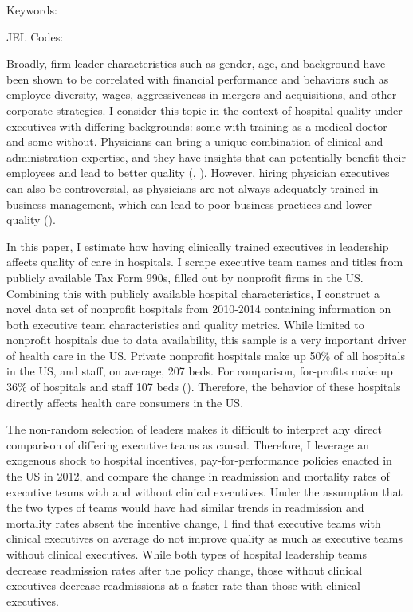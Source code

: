 \documentclass[12pt]{article}
\begin{document}
	\noindent Keywords: 
	
	\noindent JEL Codes: 
	
	\onehalfspacing
	
	\newpage

    Broadly, firm leader characteristics such as gender, age, and background have been shown to be correlated with financial performance and behaviors such as employee diversity, wages, aggressiveness in mergers and acquisitions, and other corporate strategies. I consider this topic in the context of hospital quality under executives with differing backgrounds: some with training as a medical doctor and some without. Physicians can bring a unique combination of clinical and administration expertise, and they have insights that can potentially benefit their employees and lead to better quality (\cite{Stajduhar_2023}, \cite{Ahmed_2022}). However, hiring physician executives can also be controversial, as physicians are not always adequately trained in business management, which can lead to poor business practices and lower quality (\cite{HarvardBusinessReview2018}). 

    In this paper, I estimate how having clinically trained executives in leadership affects quality of care in hospitals. I scrape executive team names and titles from publicly available Tax Form 990s, filled out by nonprofit firms in the US. Combining this with publicly available hospital characteristics, I construct a novel data set of nonprofit hospitals from 2010-2014 containing information on both executive team characteristics and quality metrics. While limited to nonprofit hospitals due to data availability, this sample is a very important driver of health care in the US. Private nonprofit hospitals make up 50\% of all hospitals in the US, and staff, on average, 207 beds. For comparison, for-profits make up 36\% of hospitals and staff 107 beds (\cite{ASPE_2023}). Therefore, the behavior of these hospitals directly affects health care consumers in the US. 
    
    The non-random selection of leaders makes it difficult to interpret any direct comparison of differing executive teams as causal. Therefore, I leverage an exogenous shock to hospital incentives, pay-for-performance policies enacted in the US in 2012, and compare the change in readmission and mortality rates of executive teams with and without clinical executives. Under the assumption that the two types of teams would have had similar trends in readmission and mortality rates absent the incentive change, I find that executive teams with clinical executives on average do not improve quality as much as executive teams without clinical executives. While both types of hospital leadership teams decrease readmission rates after the policy change, those without clinical executives decrease readmissions at a faster rate than those with clinical executives. 
    
\end{document}
